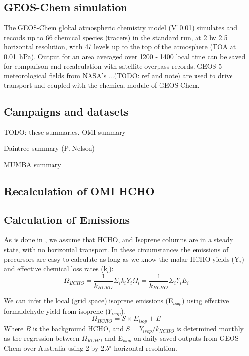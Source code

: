 \documentclass[acp, manuscript]{copernicus} %
\begin{document}
  \subsection{GEOS-Chem simulation}
    \label{sec:GEOSChemSimulation}
    The GEOS-Chem global atmospheric chemistry model (V10.01) simulates and records up to 66 chemical species (tracers) in the standard run, at 2 by 2.5$^{\circ}$ horizontal resolution, with 47 levels up to the top of the atmosphere (TOA at 0.01~hPa). 
    Output for an area averaged over 1200 - 1400 local time can be saved for comparison and recalculation with satellite overpass records.
    GEOS-5 meteorological fields from NASA's ...(TODO: ref and note) are used to drive transport and coupled with the chemical module of GEOS-Chem.
  
  \subsection{Campaigns and datasets}
    \label{sec:Campaigns}
    TODO: these summaries.
    OMI summary
    
    Daintree summary (P. Nelson)
    
    MUMBA summary
  
  \subsection{Recalculation of OMI HCHO}
  
  \subsection{Calculation of Emissions}
    \label{sec:EmissionCalculation}
    
    As is done in \citet{Palmer2003, Millet2006, Bauwens2016}, we assume that HCHO, and Isoprene columns are in a steady state, with no horizontal transport.
    In these circumstances the emissions of precursors are easy to calculate as long as we know the molar HCHO yields (Y$_i$) and effective chemical loss rates (k$_i$):
    \begin{equation}
      \Omega_{HCHO} = \frac{1}{k_{HCHO}}\Sigma_i k_i Y_i \Omega_i = \frac{1}{k_{HCHO}}\Sigma_i Y_i E_i
    \end{equation}
    
    We can infer the local (grid space) isoprene emissions (E$_{isop}$) using effective formaldehyde yield from isoprene ($Y_{isop}$).
    \begin{equation} \label{eqn:isop_yield}
      \Omega_{HCHO} = S \times E_{isop} + B
    \end{equation}
    Where \textit{B} is the background HCHO, and $S = Y_{isop}/k_{HCHO}$ is determined monthly as the regression between $\Omega_{HCHO}$ and E$_{isop}$ on daily saved outputs from GEOS-Chem over Australia using 2 by 2.5$^{\circ}$ horizontal resolution.
    
\end{document}
